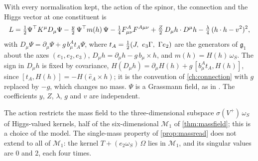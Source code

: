 With every normalisation kept, the action of the spinor, the connection and the Higgs vector at one constituent is
\begin{equation}
\label{eq:coupled}
L=\tfrac12\Psi^\top K^\mu D_\mu\Psi-\tfrac y2\,\Psi^\top m(h)\,\Psi-\tfrac14F^A_{\mu\nu}F^{A\mu\nu}+\tfrac Z2\,D_\mu h\cdot D^\mu h
-\tfrac\lambda4\,(h\cdot h-v^2)^2 ,
\end{equation}
with $D_\mu\Psi=\partial_\mu\Psi+g\,b^A_\mu t_A\Psi$, where $t_A=\tfrac12(J,\ e_3\Gamma,\ \Gamma e_2)$ are the generators of $\mathfrak g_1$
about the axes $(e_1,e_2,e_3)$, $D_\mu h=\partial_\mu h-g\,b_\mu\times h$, and $m(h)=H(h)\,\omega_S$. The sign in $D_\mu h$ is fixed by
covariance, $H(D_\mu h)=\partial_\mu H(h)+g\,[b^A_\mu t_A,H(h)]$, since $[t_A,H(h)]=-H(\hat e_A\times h)$; it is the convention of
\cref{ch:connection} with $g$ replaced by $-g$, which changes no mass. $\Psi$ is a Grassmann field, as in . The coefficients
$y$, $Z$, $\lambda$, $g$ and $v$ are independent.

The action restricts the mass field to the three-dimensional subspace $\sigma(V^+)\,\omega_S$ of Higgs-valued kernels, half of the
six-dimensional $\mathcal M_1$ of \cref{thm:massfield}; this is a choice of the model. The single-mass property of \cref{prop:massread} does
not extend to all of $\mathcal M_1$: the kernel $T+(e_2\omega_S)\,\Omega$ lies in $\mathcal M_1$, and its singular values are $0$ and $2$,
each four times.

